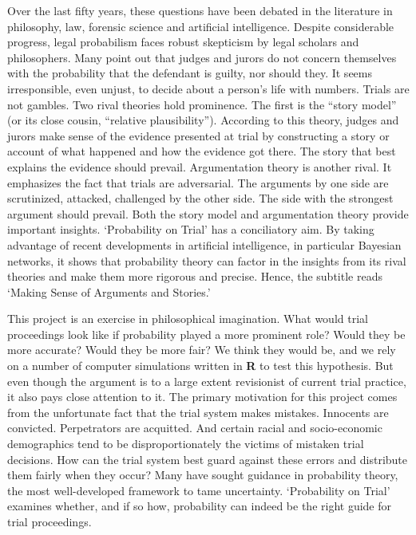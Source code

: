 \documentclass[
  10pt,
  dvipsnames,enabledeprecatedfontcommands]{scrartcl}
\begin{document}
Over the last fifty years, these questions have been debated in the
literature in philosophy, law, forensic science and artificial
intelligence. Despite considerable progress, legal probabilism faces
robust skepticism by legal scholars and philosophers. Many point out
that judges and jurors do not concern themselves with the probability
that the defendant is guilty, nor should they. It seems irresponsible,
even unjust, to decide about a person's life with numbers. Trials are
not gambles. Two rival theories hold prominence. The first is the
``story model'' (or its close cousin, ``relative plausibility'').
According to this theory, judges and jurors make sense of the evidence
presented at trial by constructing a story or account of what happened
and how the evidence got there. The story that best explains the
evidence should prevail. Argumentation theory is another rival. It
emphasizes the fact that trials are adversarial. The arguments by one
side are scrutinized, attacked, challenged by the other side. The side
with the strongest argument should prevail. Both the story model and
argumentation theory provide important insights. `Probability on Trial'
has a conciliatory aim. By taking advantage of recent developments in
artificial intelligence, in particular Bayesian networks, it shows that
probability theory can factor in the insights from its rival theories
and make them more rigorous and precise. Hence, the subtitle reads
`Making Sense of Arguments and Stories.'

This project is an exercise in philosophical imagination. What would
trial proceedings look like if probability played a more prominent role?
Would they be more accurate? Would they be more fair? We think they
would be, and we rely on a number of computer simulations written in
\textbf{\textsf{R}} to test this hypothesis. But even though the
argument is to a large extent revisionist of current trial practice, it
also pays close attention to it. The primary motivation for this project
comes from the unfortunate fact that the trial system makes mistakes.
Innocents are convicted. Perpetrators are acquitted. And certain racial
and socio-economic demographics tend to be disproportionately the
victims of mistaken trial decisions. How can the trial system best guard
against these errors and distribute them fairly when they occur? Many
have sought guidance in probability theory, the most well-developed
framework to tame uncertainty. `Probability on Trial' examines whether,
and if so how, probability can indeed be the right guide for trial
proceedings.
\end{document}
